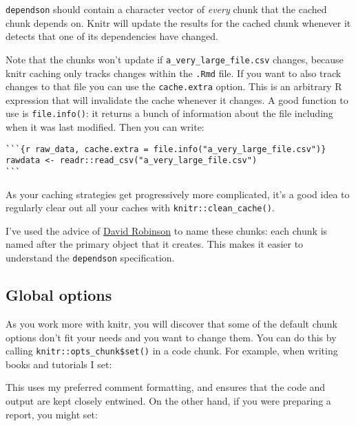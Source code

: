 \documentclass[]{book}
\newenvironment{Shaded}{\begin{snugshade}}{\end{snugshade}}
\newcommand{\KeywordTok}[1]{\textcolor[rgb]{0.13,0.29,0.53}{\textbf{{#1}}}}
\newcommand{\DataTypeTok}[1]{\textcolor[rgb]{0.13,0.29,0.53}{{#1}}}
\newcommand{\StringTok}[1]{\textcolor[rgb]{0.31,0.60,0.02}{{#1}}}
\newcommand{\OtherTok}[1]{\textcolor[rgb]{0.56,0.35,0.01}{{#1}}}
\newcommand{\NormalTok}[1]{{#1}}
\begin{document}
\texttt{dependson} should contain a character vector of \emph{every}
chunk that the cached chunk depends on. Knitr will update the results
for the cached chunk whenever it detects that one of its dependencies
have changed.

Note that the chunks won't update if \texttt{a\_very\_large\_file.csv}
changes, because knitr caching only tracks changes within the
\texttt{.Rmd} file. If you want to also track changes to that file you
can use the \texttt{cache.extra} option. This is an arbitrary R
expression that will invalidate the cache whenever it changes. A good
function to use is \texttt{file.info()}: it returns a bunch of
information about the file including when it was last modified. Then you
can write:

\begin{verbatim}
```{r raw_data, cache.extra = file.info("a_very_large_file.csv")}
rawdata <- readr::read_csv("a_very_large_file.csv")
```
\end{verbatim}

As your caching strategies get progressively more complicated, it's a
good idea to regularly clear out all your caches with
\texttt{knitr::clean\_cache()}.

I've used the advice of
\href{https://twitter.com/drob/status/738786604731490304}{David
Robinson} to name these chunks: each chunk is named after the primary
object that it creates. This makes it easier to understand the
\texttt{dependson} specification.

\subsection{Global options}\label{global-options}

As you work more with knitr, you will discover that some of the default
chunk options don't fit your needs and you want to change them. You can
do this by calling \texttt{knitr::opts\_chunk\$set()} in a code chunk.
For example, when writing books and tutorials I set:

\begin{Shaded}
\end{Shaded}

This uses my preferred comment formatting, and ensures that the code and
output are kept closely entwined. On the other hand, if you were
preparing a report, you might set:
\end{document}
